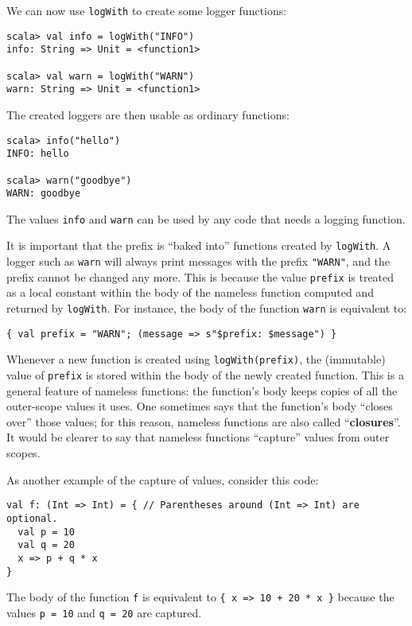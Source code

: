 We can now use \lstinline!logWith! to create some logger functions:
\begin{lstlisting}
scala> val info = logWith("INFO")
info: String => Unit = <function1>

scala> val warn = logWith("WARN")
warn: String => Unit = <function1>
\end{lstlisting}
The created loggers are then usable as ordinary functions:
\begin{lstlisting}
scala> info("hello")
INFO: hello

scala> warn("goodbye")
WARN: goodbye
\end{lstlisting}
The values \lstinline!info! and \lstinline!warn! can be used by
any code that needs a logging function.

It is important that the prefix is \textsf{``}baked into\textsf{''} functions created
by \lstinline!logWith!. A logger such as \lstinline!warn! will always
print messages with the prefix \lstinline!"WARN"!, and the prefix
cannot be changed any more. This is because the value \lstinline!prefix!
is treated as a local constant within the body of the nameless function
computed and returned by \lstinline!logWith!. For instance, the body
of the function \lstinline!warn! is equivalent to:
\begin{lstlisting}
{ val prefix = "WARN"; (message => s"$prefix: $message") }
\end{lstlisting}
Whenever a new function is created using \lstinline!logWith(prefix)!,
the (immutable) value of \lstinline!prefix! is stored within the
body of the newly created function. This is a general feature of nameless
functions: the function\textsf{'}s body keeps copies of all the outer-scope
values it uses. One sometimes says that the function\textsf{'}s body \textsf{``}closes
over\textsf{''} those values; for this reason, nameless functions are also
called \textsf{``}\textbf{closures}\textsf{''}. It would be clearer
to say that nameless functions \textsf{``}capture\textsf{''} values from outer scopes.

As another example of the capture of values, consider this code:
\begin{lstlisting}
val f: (Int => Int) = { // Parentheses around (Int => Int) are optional.
  val p = 10
  val q = 20
  x => p + q * x
}
\end{lstlisting}
The body of the function \lstinline!f! is equivalent to \lstinline!{ x => 10 + 20 * x }!
because the values \lstinline!p = 10! and \lstinline!q = 20! are
captured. 

